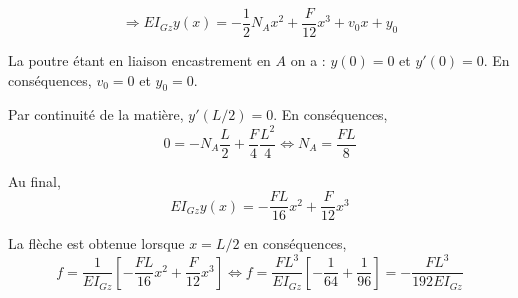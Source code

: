 \documentclass[10pt,fleqn]{article} %
\begin{document}
\begin{corrige}
$$ \Rightarrow EI_{Gz}y(x) = -\dfrac{1}{2}N_Ax^2+\dfrac{F}{12}x^3 + v_0x + y_0 $$

La poutre étant en liaison encastrement en $A$ on a : $y(0)=0$ et $y'(0)=0$.
En conséquences, $v_0=0$ et $y_0=0$.

Par continuité de la matière, $y'(L/2)=0$. En conséquences, 
$$ 0 =  -N_A \dfrac{L}{2}+\dfrac{F}{4}\dfrac{L^2}{4}
\Leftrightarrow N_A  = \dfrac{FL}{8}
 $$

Au final, 
$$ 
 EI_{Gz}y(x) = -  \dfrac{FL}{16} x^2+\dfrac{F}{12}x^3 
$$

La flèche est obtenue lorsque $x = L/2$ en conséquences, 
$$
f = \dfrac{1}{ EI_{Gz}}\left[  - \dfrac{FL}{16} x^2+\dfrac{F}{12}x^3 \right]
\Leftrightarrow 
f = \dfrac{FL^3}{ EI_{Gz}}\left[  - \dfrac{1}{64} +\dfrac{1}{96} \right] =  - \dfrac{FL^3}{192 EI_{Gz}}
$$


$$
$$
\end{corrige}
\else
\fi
\end{document}
